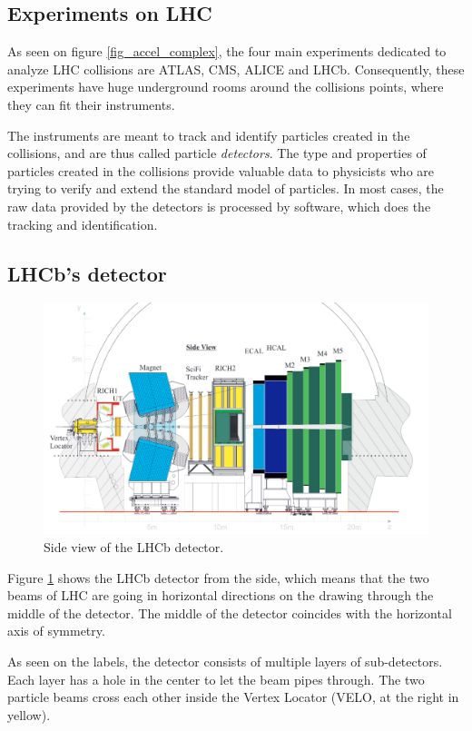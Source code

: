 \documentclass[12pt]{article}
\begin{document}
\subsection{Experiments on LHC}

As seen on figure \ref{fig_accel_complex}, the four main experiments dedicated to analyze LHC collisions are ATLAS, CMS, ALICE and LHCb. Consequently, these experiments have huge underground rooms around the collisions points, where they can fit their instruments.

The instruments are meant to track and identify particles created in the collisions, and are thus called particle \textit{detectors}. The type and properties of particles created in the collisions provide valuable data to physicists who are trying to verify and extend the standard model of particles. In most cases, the raw data provided by the detectors is processed by software, which does the tracking and identification.


\subsection{LHCb's detector}
	
\begin{figure}[H]
	\includegraphics[width=\textwidth]{lhcb_geometry_upgrade}
	\caption{Side view of the LHCb detector.}
	\label{fig_lhcb_geometry}
\end{figure}

Figure \ref{fig_lhcb_geometry} shows the LHCb detector from the side, which means that the two beams of LHC are going in horizontal directions on the drawing through the middle of the detector. The middle of the detector coincides with the horizontal axis of symmetry.

As seen on the labels, the detector consists of multiple layers of sub-detectors. Each layer has a hole in the center to let the beam pipes through. The two particle beams cross each other inside the Vertex Locator (VELO, at the right in yellow).
\end{document}
